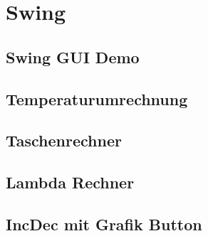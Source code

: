 \section{Swing}
\subsection{Swing GUI Demo}

\newpage
\subsection{Temperaturumrechnung}

\newpage
\subsection{Taschenrechner}


\newpage
\subsection{Lambda Rechner}

\newpage
\subsection{IncDec mit Grafik Button}

\newpage
